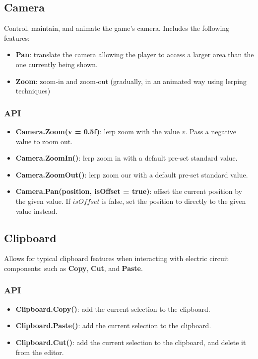 \documentclass[../main.tex]{subfiles}
\begin{document}
\subsection{Camera}
Control, maintain, and animate the game's camera. Includes the following features:
\begin{itemize}
    \item \textbf{Pan}: translate the camera allowing the player to access a larger area than the one currently being shown.
    \item \textbf{Zoom}: zoom-in and zoom-out (gradually, in an animated way using lerping techniques)
\end{itemize}
\subsubsection*{API}
\begin{itemize}
    \item \textbf{Camera.Zoom(v = 0.5f)}: lerp zoom with the value \(v\). Pass a negative value to zoom out.
    \item \textbf{Camera.ZoomIn()}: lerp zoom in with a default pre-set standard value.
    \item \textbf{Camera.ZoomOut()}: lerp zoom our with a default pre-set standard value.
    \item \textbf{Camera.Pan(position, isOffset = true)}: offset the current position by the given value. If \(isOffset\) is false, set the position to directly to the given value instead.
\end{itemize}


\subsection{Clipboard}
Allows for typical clipboard features when interacting with electric circuit components: such as \textbf{Copy}, \textbf{Cut}, and \textbf{Paste}. 
\subsubsection*{API}
\begin{itemize}
    \item \textbf{Clipboard.Copy()}: add the current selection to the clipboard.
    \item \textbf{Clipboard.Paste()}: add the current selection to the clipboard.
    \item \textbf{Clipboard.Cut()}: add the current selection to the clipboard, and delete it from the editor.
\end{itemize}
\end{document}
